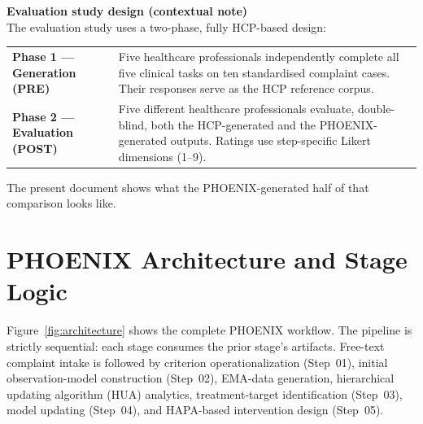 \documentclass[11pt,a4paper]{article}
\begin{document}
\begin{tcolorbox}[
  colback=PhoenixSoft,colframe=PhoenixBorder,
  boxrule=0.6pt,arc=1.5mm
]
\textbf{Evaluation study design (contextual note)}\\[0.3em]
\small
The evaluation study uses a two-phase, fully HCP-based design:

\medskip
\renewcommand{\arraystretch}{1.20}
\begin{tabularx}{\textwidth}{@{}>{\bfseries}p{}X@{}}
Phase 1 — Generation (PRE) & Five healthcare professionals independently complete all five clinical tasks on ten standardised complaint cases. Their responses serve as the HCP reference corpus. \\
Phase 2 — Evaluation (POST) & Five different healthcare professionals evaluate, double-blind, both the HCP-generated and the PHOENIX-generated outputs. Ratings use step-specific Likert dimensions (1--9). \\
\end{tabularx}
\renewcommand{\arraystretch}{1.0}

\medskip
The present document shows what the PHOENIX-generated half of that comparison looks like.
\end{tcolorbox}

\section{PHOENIX Architecture and Stage Logic}

Figure~\ref{fig:architecture} shows the complete PHOENIX workflow. The pipeline is strictly sequential: each stage consumes the prior stage's artifacts. Free-text complaint intake is followed by criterion operationalization (Step~01), initial observation-model construction (Step~02), EMA-data generation, hierarchical updating algorithm (HUA) analytics, treatment-target identification (Step~03), model updating (Step~04), and HAPA-based intervention design (Step~05).
\end{document}

